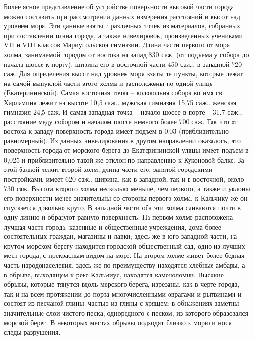 Более ясное представление об устройстве поверхности
высокой части города можно составить при рассмотрении данных измерения
расстояний и высот над уровнем моря. Эти данные взяты с различных точек из
материалов, собранных при составлении плана города, а также нивелировок,
произведенных учениками VII и VIII классов Мариупольской гимназии. Длина части
первого от моря холма, занимаемой городом от востока на запад 830 саж. (от
подъема у собора до начала шоссе к порту), ширина его в восточной части 450
саж., в западной 720 саж. Для определения высот над уровнем моря взяты те
пункты, которые лежат на самой выпуклой части этого холма и расположены по
одной улице (Екатерининской). Самая восточная точка – колокольня собора во имя
св. Харлампия лежит на высоте 10,5 саж., мужская гимназия 15,75 саж., женская
гимназия 24,5 саж. И самая западная точка – начало шоссе в порте – 31,7 саж.,
расстояние меду собором и началом шоссе немного более 700 саж. Так что от
востока к западу поверхность города имеет подъем в 0,03 (приблизительно
равномерный). Из данных нивелирования в другом направлении оказалось, что
поверхность города от морского берега до Екатерининской улицы имеет подъем в
0,025 и приблизительно такой же отклон по направлению к Куконовой балке. За
этой балкой лежит второй холм, длина части его, занятой городскими постройками,
имеет 620 саж., ширина, как в западной, так и в восточной, около 730 саж.
Высота второго холма несколько меньше, чем первого, а также и уклоны его
поверхности менее значительны со стороны первого холма, к Кальчику же он
спускается довольно круто. В западной части оба эти холма сливаются почти в
одну линию и образуют равную поверхность. На первом холме расположена лучшая
часто города: казенные и общественные учреждения, дома более состоятельных
граждан, магазины и лавки; здесь же в юго-западной части, на крутом морском
берегу находится городской общественный сад, одно из лучших мест города, с
прекрасным видом на море. На втором холме живет более бедная часть
народонаселения, здесь же по преимуществу находятся хлебные  амбары, а в
обрыве, выходящем к реке Кальмиус, находятся каменоломни. Высокие обрывы,
которые тянутся вдоль морского берега, изрезаны, как в черте города, так и на
всем протяжении до порта многочисленными оврагами и рытвинами и состоят из
песчаной глины, частью из глины с хрящем; в обнажениях заметны значительные
слои чистого песка, однородного с песком, из которого образовался морской
берег. В некоторых местах обрывы подходят близко к морю и носят следы
разрушения.

